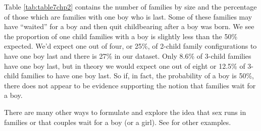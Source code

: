\documentclass[
]{krantz}
\begin{document}
\begin{table}

\caption{\label{tab:table6chp2}Proportion of families in NLSY data with all the same sex by number of children in the family. Note that 1-child families are all homogeneous with respect to sex so we look at 2- and 3- child families.}
\centering
{}
\end{table}

Table \ref{tab:table7chp2} contains the number of families by size and the percentage of those which are families with one boy who is last. Some of these families may have ``waited'' for a boy and then quit childbearing after a boy was born. We see the proportion of one child families with a boy is slightly less than the 50\% expected. We'd expect one out of four, or 25\%, of 2-child family configurations to have one boy last and there is 27\% in our dataset. Only 8.6\% of 3-child families have one boy last, but in theory we would expect one out of eight or 12.5\% of 3-child families to have one boy last. So if, in fact, the probability of a boy is 50\%, there does not appear to be evidence supporting the notion that families wait for a boy.

\begin{table}

\caption{\label{tab:table7chp2}Proportion of families in NLSY data with only one boy who is born last.}
\centering
{}
\end{table}

There are many other ways to formulate and explore the idea that sex runs in families or that couples wait for a boy (or a girl). See \citet{Rodgers2001} for other examples.
\end{document}
